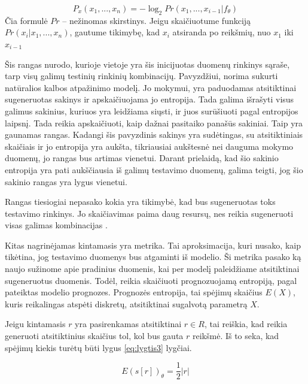 \documentclass{VUMIFInfBakalaurinis}
\begin{document}
\begin{equation}
P_{x}(x_{1}, ..., x_{n}) = -\log_{2} Pr(x_{1}, ..., x_{i - 1} | f_{\theta})
\label{eq:Lygtis 2.}
\end{equation}
Čia formulė $Pr$ -- nežinomas skirstinys. Jeigu skaičiuotume funkciją $Pr(x_{i} | x_{1}, ..., x_{n})$, gautume tikimybę, kad $x_{i}$ atsiranda po reikšmių, nuo $x_{1}$ iki $x_{i-1}$

\par Šis rangas nurodo, kurioje vietoje yra šis inicijuotas duomenų rinkinys sąraše, tarp visų galimų testinių rinkinių kombinacijų. Pavyzdžiui, norima 
sukurti natūralios kalbos atpažinimo modelį. Jo mokymui, yra paduodamas atsitiktinai sugeneruotas sakinys  ir apskaičiuojama jo entropija. Tada galima išrašyti visus galimus sakinius, kuriuos yra leidžiama siųsti, ir juos surūšiuoti pagal entropijos laipsnį. Tada reikia apskaičiuoti, kaip dažnai pasitaiko panašūs sakiniai. Taip yra gaunamas rangas. Kadangi šis pavyzdinis sakinys yra sudėtingas, su atsitiktiniais skaičiais ir jo entropija yra aukšta, tikriausiai aukštesnė nei dauguma mokymo duomenų, jo rangas bus artimas vienetui. Darant prielaidą, kad šio sakinio entropija yra pati aukščiausia iš galimų testavimo duomenų, galima teigti, jog šio sakinio rangas yra lygus vienetui.
\par Rangas tiesiogiai nepasako kokia yra tikimybė, kad bus sugeneruotas toks testavimo rinkinys. Jo skaičiavimas paima daug resursų, nes reikia sugeneruoti visas galimas kombinacijas \cite{11}.
\par Kitas nagrinėjamas kintamasis yra  metrika. Tai aproksimacija, kuri nusako, kaip tikėtina, jog testavimo duomenys bus atgaminti iš modelio. Ši metrika pasako ką naujo sužinome apie pradinius duomenis, kai per modelį paleidžiame atsitiktinai sugeneruotus duomenis. Todėl, reikia skaičiuoti prognozuojamą entropiją, pagal pateiktas modelio prognozes. Prognozės entropija, tai spėjimų skaičius $E(X)$, kuris reikalingas atspėti diskretų, atsitiktinai sugalvotą parametrą $X$.
\par Jeigu kintamasis $r$ yra pasirenkamas atsitiktinai $r \in R$, tai reiškia, kad reikia generuoti atsitiktinius skaičius tol, kol bus gauta $r$ reikšmė. Iš to seka, kad spėjimų kiekis turėtų būti lygus \eqref{eq:lygtis3} lygčiai. 

\begin{equation}
E(s[r])_{\theta} = \frac{1}{2} | r |
\label{eq:lygtis3}
\end{equation}
\end{document}
